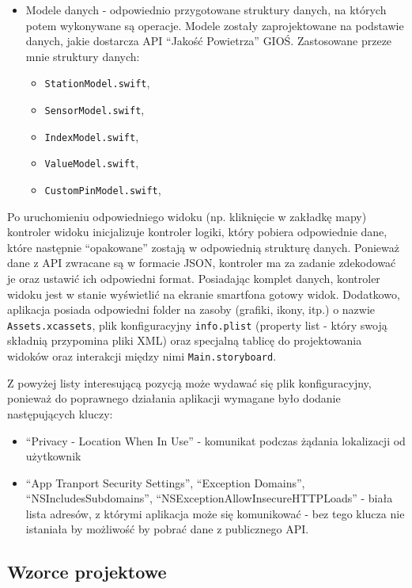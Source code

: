 \documentclass[a4paper,11pt,titlepage]{article}
\begin{document}
\begin{itemize}
	\item Modele danych - odpowiednio przygotowane struktury danych, na których potem wykonywane są operacje. Modele zostały zaprojektowane na podstawie danych, jakie dostarcza API ``Jakość Powietrza'' GIOŚ. Zastosowane przeze mnie struktury danych:  
	\begin{itemize}
		\item \verb|StationModel.swift|,  
		\item \verb|SensorModel.swift|,
		\item \verb|IndexModel.swift|,
		\item \verb|ValueModel.swift|,
		\item \verb|CustomPinModel.swift|,
	\end{itemize}
\end{itemize}

Po uruchomieniu odpowiedniego widoku (np. kliknięcie w zakładkę mapy) kontroler widoku inicjalizuje kontroler logiki, który pobiera odpowiednie dane, które następnie ``opakowane'' zostają w odpowiednią strukturę danych. Ponieważ dane z API zwracane są w formacie JSON, kontroler ma za zadanie zdekodować je oraz ustawić ich odpowiedni format. Posiadając komplet danych, kontroler widoku jest w stanie wyświetlić na ekranie smartfona gotowy widok.
Dodatkowo, aplikacja posiada odpowiedni folder na zasoby (grafiki, ikony, itp.) o nazwie \verb|Assets.xcassets|, plik konfiguracyjny \verb|info.plist| (property list - który swoją składnią przypomina pliki XML) oraz specjalną tablicę do projektowania widoków oraz interakcji między nimi  \verb|Main.storyboard|.

Z powyżej listy interesującą pozycją może wydawać się plik konfiguracyjny, ponieważ do poprawnego działania aplikacji wymagane było dodanie następujących kluczy:
\begin{itemize}
 	\item ``Privacy - Location When In Use'' - komunikat podczas żądania lokalizacji od użytkownik
	\item ``App Tranport Security Settings'', ``Exception Domains'', ``NSIncludesSubdomains'', ``NSExceptionAllowInsecureHTTPLoads'' - biała lista adresów, z którymi aplikacja może się komunikować - bez tego klucza nie istaniała by możliwość by pobrać dane z publicznego API.
\end{itemize}

\subsection{Wzorce projektowe}
\end{document}
